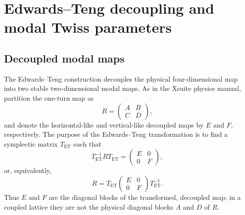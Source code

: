 \documentclass[11pt,a4paper]{article}
\begin{document}
\section{Edwards--Teng decoupling and modal Twiss parameters}
\label{sec:et-twiss}

\subsection{Decoupled modal maps}

The Edwards--Teng construction decouples the physical four-dimensional map
into two stable two-dimensional modal maps.  As in the Xsuite physics manual,
partition the one-turn map as
\begin{equation}
 R=\begin{pmatrix}A&B\\C&D\end{pmatrix},
\end{equation}
and denote the horizontal-like and vertical-like decoupled maps by $E$ and
$F$, respectively.  The purpose of the Edwards--Teng transformation is to
find a symplectic matrix $T_{\mathrm{ET}}$ such that
\begin{equation}
 T_{\mathrm{ET}}^{-1}RT_{\mathrm{ET}}
 =\begin{pmatrix}E&0\\0&F\end{pmatrix},
 \label{eq:et-decoupled-map}
\end{equation}
or, equivalently,
\begin{equation}
 R=T_{\mathrm{ET}}
 \begin{pmatrix}E&0\\0&F\end{pmatrix}
 T_{\mathrm{ET}}^{-1}.
 \label{eq:et-map-reconstruction}
\end{equation}
Thus $E$ and $F$ are the diagonal blocks of the transformed, decoupled map;
in a coupled lattice they are not the physical diagonal blocks $A$ and $D$ of
$R$.
\end{document}
